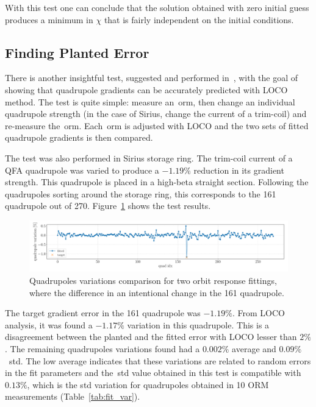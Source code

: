 With this test one can conclude that the solution obtained with zero initial guess produces a minimum in $\chi$ that is fairly independent on the initial conditions.
\subsection{Finding Planted Error}
There is another insightful test, suggested and performed in~\cite{safranek1995}, with the goal of showing that quadrupole gradients can be accurately predicted with LOCO method. The test is quite simple: measure an~\gls{orm}, then change an individual quadrupole strength (in the case of Sirius, change the current of a trim-coil) and re-measure the~\gls{orm}. Each~\gls{orm} is adjusted with LOCO and the two sets of fitted quadrupole gradients is then compared.

The test was also performed in Sirius storage ring. The trim-coil current of a QFA quadrupole was varied to produce a $-1.19\%$ reduction in its gradient strength. This quadrupole is placed in a high-beta straight section. Following the quadrupoles sorting around the storage ring, this corresponds to the 161 quadrupole out of 270. Figure~\ref{fig:delta_13M1_qfa} shows the test results.
\begin{figure}
\centering
\includegraphics[width=1.0\textwidth]{figures/delta_13M1_QFA.pdf}
\caption{Quadrupoles variations comparison for two orbit response fittings, where the difference in an intentional change in the 161 quadrupole.}
\label{fig:delta_13M1_qfa}
\end{figure}

The target gradient error in the 161 quadrupole was $-1.19\%$. From LOCO analysis, it was found a $-1.17\%$ variation in this quadrupole. This is a disagreement between the planted and the fitted error with LOCO lesser than $2\%$. The remaining quadrupoles variations found had a $0.002\%$ average and $0.09\%$~\gls{std}. The low average indicates that these variations are related to random errors in the fit parameters and the~\gls{std} value obtained in this test is compatible with $0.13\%$, which is the std variation for quadrupoles obtained in 10 ORM measurements (Table~\ref{tab:fit_var}).

